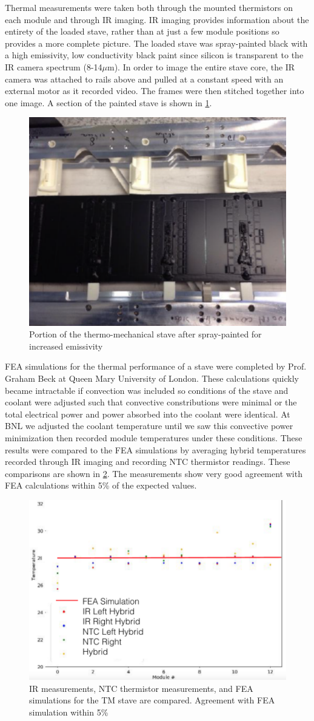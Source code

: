 Thermal measurements were taken both through the mounted thermistors on each module and through IR imaging. IR imaging provides information about the entirety of the loaded stave, rather than at just a few module positions so provides a more complete picture. The loaded stave was spray-painted black with a high emissivity, low conductivity black paint since silicon is transparent to the IR camera spectrum (8-14$\mu$m). In order to image the entire stave core, the IR camera was attached to rails above and pulled at a constant speed with an external motor as it recorded video. The frames were then stitched together into one image. A section of the painted stave is shown in \ref{fig:paintedstave}.  

\begin{figure}[!h]
        \centering
    \includegraphics[width=.4\textwidth]{Pictures/paintedstave.png}
    \caption{Portion of the thermo-mechanical stave after spray-painted for increased emissivity}
    \label{fig:paintedstave}
\end{figure}

FEA simulations for the thermal performance of a stave were completed by Prof. Graham Beck at Queen Mary University of London. These calculations quickly became intractable if convection was included so conditions of the stave and coolant were adjusted such that convective constributions were minimal or the total electrical power and power absorbed into the coolant were identical. At BNL we adjusted the coolant temperature until we saw this convective power minimization then recorded module temperatures under these conditions. These results were compared to the FEA simulations by averaging hybrid temperatures recorded through IR imaging and recording NTC thermistor readings. These comparisons are shown in \ref{fig:FEAcompare}. The measurements show very good agreement with FEA calculations within 5\% of the expected values.

\begin{figure}[!h]
        \centering
    \includegraphics[width=.4\textwidth]{Pictures/FEAcompare.png}
    \caption{IR measurements, NTC thermistor measurements, and FEA simulations for the TM stave are compared. Agreement with FEA simulation within 5\%}
    \label{fig:FEAcompare}
\end{figure} 

